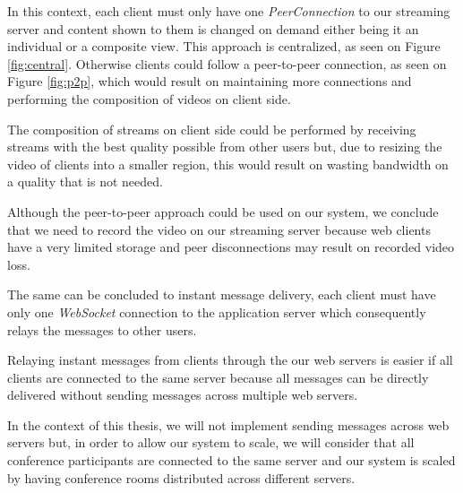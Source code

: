 
	In this context, each client must only have one \emph{PeerConnection} to our streaming server and content shown to them is changed on demand either being it an individual or a composite view. This approach is centralized, as seen on Figure \ref{fig:central}. Otherwise clients could follow a peer-to-peer connection, as seen on Figure \ref{fig:p2p}, which would result on maintaining more connections and performing the composition of videos on client side.


	The composition of streams on client side could be performed by receiving streams with the best quality possible from other users but, due to resizing the video of clients into a smaller region, this would result on wasting bandwidth on a quality that is not needed.


	Although the peer-to-peer approach could be used on our system, we conclude that we need to record the video on our streaming server because web clients have a very limited storage and peer disconnections may result on recorded video loss. 

	The same can be concluded to instant message delivery, each client must have only one \emph{WebSocket} connection to the application server which consequently relays the messages to other users.

	Relaying instant messages from clients through the our web servers is easier if all clients are connected to the same server because all messages can be directly delivered without sending messages across multiple web servers. 

	In the context of this thesis, we will not implement sending messages across web servers but, in order to allow our system to scale, we will consider that all conference participants are connected to the same server and our system is scaled by having conference rooms distributed across different servers.


